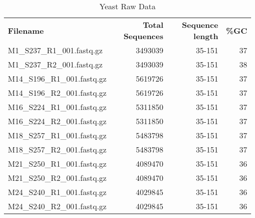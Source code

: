 \documentclass[]{article}
\begin{document}
\begin{table}[]
\centering
\label{yeast-files}
\begin{tabular}{l|r|r|r}
\textbf{Filename}           &\textbf{Total Sequences} & \textbf{Sequence length} & \textbf{\%GC} \\
M1\_S237\_R1\_001.fastq.gz  & 3493039                                      & 35-151                                       & 37                                \\
M1\_S237\_R2\_001.fastq.gz  & 3493039                                      & 35-151                                       & 38                                \\
M14\_S196\_R1\_001.fastq.gz & 5619726                                      & 35-151                                       & 37                                \\
M14\_S196\_R2\_001.fastq.gz & 5619726                                      & 35-151                                       & 37                                \\
M16\_S224\_R1\_001.fastq.gz & 5311850                                      & 35-151                                       & 37                                \\
M16\_S224\_R2\_001.fastq.gz & 5311850                                      & 35-151                                       & 37                                \\
M18\_S257\_R1\_001.fastq.gz & 5483798                                      & 35-151                                       & 37                                \\
M18\_S257\_R2\_001.fastq.gz & 5483798                                      & 35-151                                       & 37                                \\
M21\_S250\_R1\_001.fastq.gz & 4089470                                      & 35-151                                       & 36                                \\
M21\_S250\_R2\_001.fastq.gz & 4089470                                      & 35-151                                       & 36                                \\
M24\_S240\_R1\_001.fastq.gz & 4029845                                      & 35-151                                       & 36                                \\
M24\_S240\_R2\_001.fastq.gz & 4029845                                      & 35-151                                       & 36                               
\end{tabular}
\caption{Yeast Raw Data}
\end{table}
\end{document}
